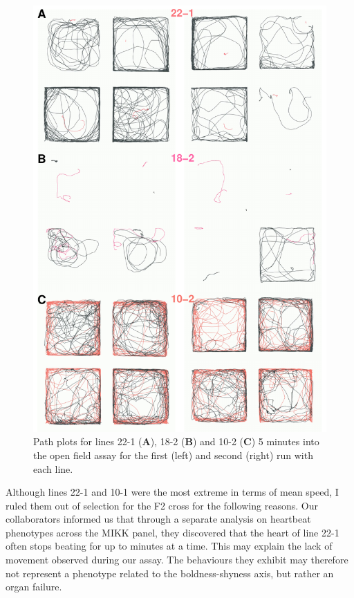 \documentclass[
]{book}
\begin{document}
\begin{figure}
\includegraphics[width=1\linewidth]{figs/mikk_behaviour/path_plot_22-1_18-2_10-1_300} \caption{Path plots for lines 22-1 (\textbf{A}), 18-2 (\textbf{B}) and 10-2 (\textbf{C}) 5 minutes into the open field assay for the first (left) and second (right) run with each line.}\label{fig:extreme-paths}
\end{figure}

Although lines \textcolor{22-1_FB737A}{22-1} and \textcolor{10-1_F8766D}{10-1} were the most extreme in terms of mean speed, I ruled them out of selection for the F2 cross for the following reasons. Our collaborators informed us that through a separate analysis on heartbeat phenotypes across the MIKK panel, they discovered that the heart of line \textcolor{22-1_FB737A}{22-1} often stops beating for up to minutes at a time. This may explain the lack of movement observed during our assay. The behaviours they exhibit may therefore not represent a phenotype related to the boldness-shyness axis, but rather an organ failure.
\end{document}
